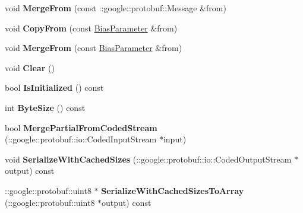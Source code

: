\begin{DoxyCompactItemize}
void {\bfseries Merge\+From} (const \+::google\+::protobuf\+::\+Message \&from)
\item 
\mbox{\label{classcaffe_1_1_bias_parameter_a9b2cc6323b7e85818c6a84e5c0b25f32}} 
void {\bfseries Copy\+From} (const \mbox{\hyperlink{classcaffe_1_1_bias_parameter}{Bias\+Parameter}} \&from)
\item 
\mbox{\label{classcaffe_1_1_bias_parameter_a1dd19981d9b749ccf54f3f6add8fc85e}} 
void {\bfseries Merge\+From} (const \mbox{\hyperlink{classcaffe_1_1_bias_parameter}{Bias\+Parameter}} \&from)
\item 
\mbox{\label{classcaffe_1_1_bias_parameter_a63ee46aa9cca86ce53a1e84ef1b9c47c}} 
void {\bfseries Clear} ()
\item 
\mbox{\label{classcaffe_1_1_bias_parameter_aaba27851350dfd93697d0f6d2d845b30}} 
bool {\bfseries Is\+Initialized} () const
\item 
\mbox{\label{classcaffe_1_1_bias_parameter_aae108b33f6e7559d46aa4ea4caa800a6}} 
int {\bfseries Byte\+Size} () const
\item 
\mbox{\label{classcaffe_1_1_bias_parameter_ad4247ab47d988149636aaac0961cb8e4}} 
bool {\bfseries Merge\+Partial\+From\+Coded\+Stream} (\+::google\+::protobuf\+::io\+::\+Coded\+Input\+Stream $\ast$input)
\item 
\mbox{\label{classcaffe_1_1_bias_parameter_ad0c41127520d0c27c12177a0a12f350f}} 
void {\bfseries Serialize\+With\+Cached\+Sizes} (\+::google\+::protobuf\+::io\+::\+Coded\+Output\+Stream $\ast$output) const
\item 
\mbox{\label{classcaffe_1_1_bias_parameter_a595d1ecd5de935eab4db86428e1dbeee}} 
\+::google\+::protobuf\+::uint8 $\ast$ {\bfseries Serialize\+With\+Cached\+Sizes\+To\+Array} (\+::google\+::protobuf\+::uint8 $\ast$output) const
\item 
\mbox{\label{classcaffe_1_1_bias_parameter_a155ade9577cc26653f6705d9f9c55012}} 

\end{DoxyCompactItemize}
